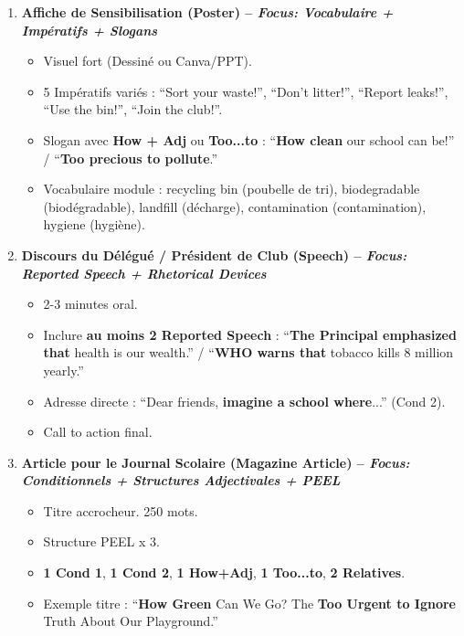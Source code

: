 \documentclass[11pt]{article}
\newcommand{\cle}[1]{{\popxbold\color{popdark}#1}}
\begin{document}
\begin{exemplebox}
\begin{enumerate}
    \item \textbf{Affiche de Sensibilisation (Poster) -- \textit{Focus: Vocabulaire + Impératifs + Slogans}}
    \begin{itemize}
        \item Visuel fort (Dessiné ou Canva/PPT).
        \item 5 Impératifs variés : ``Sort your waste!'', ``Don't litter!'', ``Report leaks!'', ``Use the bin!'', ``Join the club!''.
        \item Slogan avec \textbf{How + Adj} ou \textbf{Too...to} : ``\textbf{How clean} our school can be!'' / ``\textbf{Too precious to pollute}.''
        \item Vocabulaire module : \cle{recycling bin} (poubelle de tri), \cle{biodegradable} (biodégradable), \cle{landfill} (décharge), \cle{contamination} (contamination), \cle{hygiene} (hygiène).
    \end{itemize}

    \item \textbf{Discours du Délégué / Président de Club (Speech) -- \textit{Focus: Reported Speech + Rhetorical Devices}}
    \begin{itemize}
        \item 2-3 minutes oral.
        \item Inclure \textbf{au moins 2 Reported Speech} : ``\textbf{The Principal emphasized that} health is our wealth.'' / ``\textbf{WHO warns that} tobacco kills 8 million yearly.''
        \item Adresse directe : ``Dear friends, \textbf{imagine a school where}...'' (Cond 2).
        \item Call to action final.
    \end{itemize}

    \item \textbf{Article pour le Journal Scolaire (Magazine Article) -- \textit{Focus: Conditionnels + Structures Adjectivales + PEEL}}
    \begin{itemize}
        \item Titre accrocheur. 250 mots.
        \item Structure PEEL x 3.
        \item \textbf{1 Cond 1}, \textbf{1 Cond 2}, \textbf{1 How+Adj}, \textbf{1 Too...to}, \textbf{2 Relatives}.
        \item Exemple titre : ``\textbf{How Green} Can We Go? The \textbf{Too Urgent to Ignore} Truth About Our Playground.''
    \end{itemize}


\end{enumerate}
\end{exemplebox}
\end{document}

